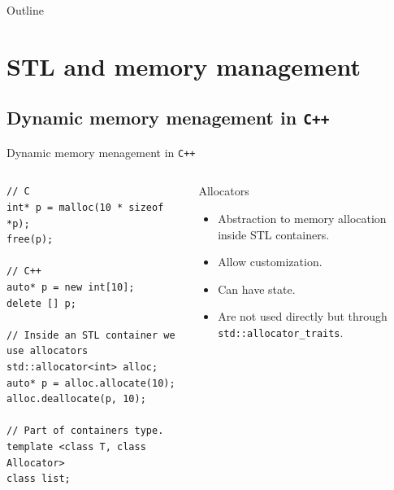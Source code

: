 \documentclass[10pt,aspectratio=169]{beamer}
\begin{document}
\begin{frame}{Outline}
   \tableofcontents
\end{frame}

\section{STL and memory management}

\subsection{Dynamic memory menagement in \texttt{C++}}

\begin{frame}[fragile]{Dynamic memory menagement in \texttt{C++}}
\begin{columns}
\begin{column}{0.45\textwidth}
\begin{lstlisting}
// C
int* p = malloc(10 * sizeof *p);
free(p);

// C++
auto* p = new int[10];
delete [] p;

// Inside an STL container we use allocators
std::allocator<int> alloc;
auto* p = alloc.allocate(10);
alloc.deallocate(p, 10);

// Part of containers type.
template <class T, class Allocator>
class list;
\end{lstlisting}
\end{column}

\begin{column}{0.5\textwidth}
\begin{block} {Allocators}
\begin{itemize}
\item Abstraction to memory allocation inside STL containers.
\item Allow customization.
\item Can have state.
\item Are not used directly but through
\texttt{std::allocator\_traits}.
\end{itemize}
\end{block}
\end{column}
\end{columns}
\end{frame}
\end{document}
